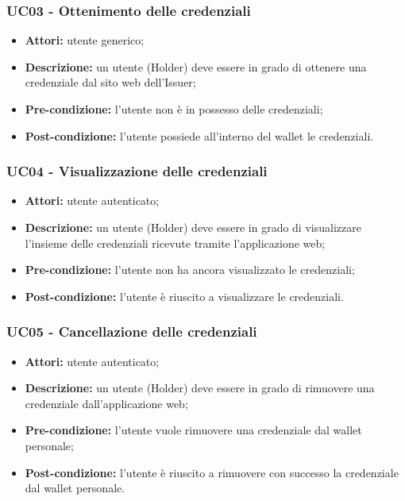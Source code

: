 \subsubsection{UC03 - Ottenimento delle credenziali}
\begin{itemize}
\item \textbf{Attori:} utente generico;
\item \textbf{Descrizione:} un utente (Holder) deve essere in grado di ottenere una credenziale dal sito web dell'Issuer;
\item\textbf{Pre-condizione:} l’utente non è in possesso delle credenziali;
\item \textbf{Post-condizione:} l’utente possiede all’interno del wallet le credenziali.
\end{itemize}

\subsubsection{UC04 - Visualizzazione delle credenziali}
\begin{itemize}
\item \textbf{Attori:} utente autenticato;
\item \textbf{Descrizione:} un utente (Holder) deve essere in grado di visualizzare l'insieme delle credenziali ricevute tramite l'applicazione web;
\item \textbf{Pre-condizione:} l’utente non ha ancora visualizzato le credenziali;
\item \textbf{Post-condizione:} l’utente è riuscito a visualizzare le credenziali.
\end{itemize}

\subsubsection{UC05 - Cancellazione delle credenziali}
\begin{itemize}
\item \textbf{Attori:} utente autenticato;
\item \textbf{Descrizione:} un utente (Holder) deve essere in grado di rimuovere una credenziale dall'applicazione web;
\item \textbf{Pre-condizione:} l’utente vuole rimuovere una credenziale dal wallet personale;
\item \textbf{Post-condizione:} l’utente è riuscito a rimuovere con successo la credenziale dal wallet personale.
\end{itemize}

